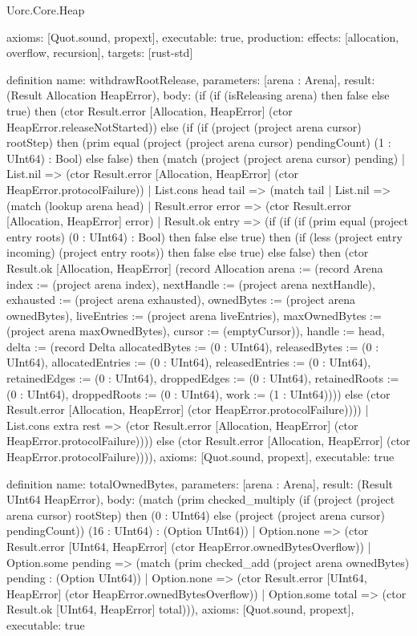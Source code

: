 \begin{lexlean}{Uorc.Core.Heap}
\begin{semanticmodule}
{  axioms: [Quot.sound, propext],
  executable: true,
  production: {effects: [allocation, overflow, recursion], targets: [rust-std]}
}

definition{
  name: withdrawRootRelease,
  parameters: [arena : Arena],
  result: (Result Allocation HeapError),
  body: (if (if (isReleasing arena) then false else true) then (ctor Result.error [Allocation, HeapError] (ctor HeapError.releaseNotStarted)) else (if (if (project (project arena cursor) rootStep) then (prim equal (project (project arena cursor) pendingCount) (1 : UInt64) : Bool) else false) then (match (project (project arena cursor) pending)
    | List.nil => (ctor Result.error [Allocation, HeapError] (ctor HeapError.protocolFailure))
    | List.cons head tail => (match tail
      | List.nil => (match (lookup arena head)
        | Result.error error => (ctor Result.error [Allocation, HeapError] error)
        | Result.ok entry => (if (if (if (prim equal (project entry roots) (0 : UInt64) : Bool) then false else true) then (if (less (project entry incoming) (project entry roots)) then false else true) else false) then (ctor Result.ok [Allocation, HeapError] (record Allocation {arena := (record Arena {index := (project arena index), nextHandle := (project arena nextHandle), exhausted := (project arena exhausted), ownedBytes := (project arena ownedBytes), liveEntries := (project arena liveEntries), maxOwnedBytes := (project arena maxOwnedBytes), cursor := (emptyCursor)}), handle := head, delta := (record Delta {allocatedBytes := (0 : UInt64), releasedBytes := (0 : UInt64), allocatedEntries := (0 : UInt64), releasedEntries := (0 : UInt64), retainedEdges := (0 : UInt64), droppedEdges := (0 : UInt64), retainedRoots := (0 : UInt64), droppedRoots := (0 : UInt64), work := (1 : UInt64)})})) else (ctor Result.error [Allocation, HeapError] (ctor HeapError.protocolFailure))))
      | List.cons extra rest => (ctor Result.error [Allocation, HeapError] (ctor HeapError.protocolFailure)))) else (ctor Result.error [Allocation, HeapError] (ctor HeapError.protocolFailure)))),
  axioms: [Quot.sound, propext],
  executable: true
}

definition{
  name: totalOwnedBytes,
  parameters: [arena : Arena],
  result: (Result UInt64 HeapError),
  body: (match (prim checked_multiply (if (project (project arena cursor) rootStep) then (0 : UInt64) else (project (project arena cursor) pendingCount)) (16 : UInt64) : (Option UInt64))
    | Option.none => (ctor Result.error [UInt64, HeapError] (ctor HeapError.ownedBytesOverflow))
    | Option.some pending => (match (prim checked_add (project arena ownedBytes) pending : (Option UInt64))
      | Option.none => (ctor Result.error [UInt64, HeapError] (ctor HeapError.ownedBytesOverflow))
      | Option.some total => (ctor Result.ok [UInt64, HeapError] total))),
  axioms: [Quot.sound, propext],
  executable: true
}


\end{semanticmodule}
\end{lexlean}
